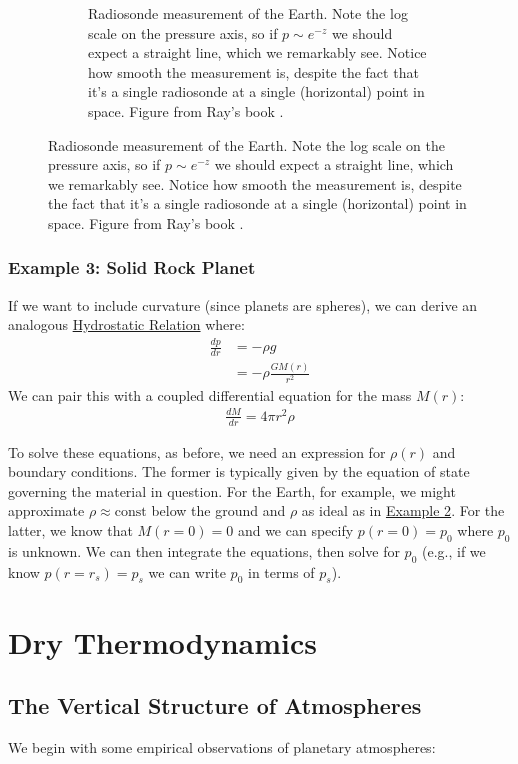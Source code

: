 \begin{figure}[H]
\begin{subfigure}{0.45\linewidth}
    \caption{Radiosonde measurement of the Earth. Note the log scale on the pressure axis, so if $p\sim e^{-z}$ we should expect a straight line, which we remarkably see. Notice how smooth the measurement is, despite the fact that it's a single radiosonde at a single  (horizontal) point in space. Figure from Ray's book \cite{Ray}.}
    \end{subfigure}
\end{figure}

\subsection{Example 3: Solid Rock Planet}

If we want to include curvature (since planets are spheres), we can derive an analogous \hyperref[Hydrostatic Balance]{Hydrostatic Relation} where:
\begin{align*}
    \frac{d p}{d r}&=-\rho g\\
    &=-\rho \frac{G M(r)}{r^{2}}
\end{align*}
We can pair this with a coupled differential equation for the mass $M(r)$:
\begin{align*}
    \frac{d M}{d r} = 4\pi r^2\rho
\end{align*}

To solve these equations, as before, we need an expression for $\rho(r)$ and boundary conditions. The former is typically given by the equation of state governing the material in question. For the Earth, for example, we might approximate $\rho\approx \text{const}$ below the ground and $\rho$ as ideal as in \hyperref[Example 2: Ideal Gas]{Example 2}. For the latter, we know that $M(r=0)=0$ and we can specify $p(r=0)=p_0$ where $p_0$ is unknown. We can then integrate the equations, then solve for $p_0$ (e.g., if we know $p(r=r_s)=p_s$ we can write $p_0$ in terms of $p_s$).

\chapter{Dry Thermodynamics}\label{Dry Thermodynamics}

\section{The Vertical Structure of Atmospheres}\label{Vertical Structure}

We begin with some empirical observations of planetary atmospheres:

